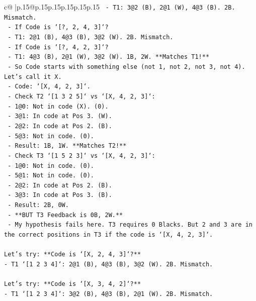 \documentclass{article}
\begin{document}
{\begin{supertabular}{c@{$\;$}|p{.15\linewidth}@{}p{.15\linewidth}p{.15\linewidth}p{.15\linewidth}p{.15\linewidth}p{.15\linewidth}}
{{{\texttt{        {-} T1: 3@2 (B), 2@1 (W), 4@3 (B). 2B. Mismatch.} \\
\texttt{      {-} If Code is `{[}?, 2, 4, 3{]}`?} \\
\texttt{        {-} T1: 2@1 (B), 4@3 (B), 3@2 (W). 2B. Mismatch.} \\
\texttt{      {-} If Code is `{[}?, 4, 2, 3{]}`?} \\
\texttt{        {-} T1: 4@3 (B), 2@1 (W), 3@2 (W). 1B, 2W. **Matches T1!**} \\
\texttt{        {-} So Code starts with something else (not 1, not 2, not 3, not 4). Let's call it X.} \\
\texttt{        {-} Code: `{[}X, 4, 2, 3{]}`.} \\
\texttt{        {-} Check T2 `{[}1 3 2 5{]}` vs `{[}X, 4, 2, 3{]}`:} \\
\texttt{          {-} 1@0: Not in code (X). (0).} \\
\texttt{          {-} 3@1: In code at Pos 3. (W).} \\
\texttt{          {-} 2@2: In code at Pos 2. (B).} \\
\texttt{          {-} 5@3: Not in code. (0).} \\
\texttt{          {-} Result: 1B, 1W. **Matches T2!**} \\
\texttt{        {-} Check T3 `{[}1 5 2 3{]}` vs `{[}X, 4, 2, 3{]}`:} \\
\texttt{          {-} 1@0: Not in code. (0).} \\
\texttt{          {-} 5@1: Not in code. (0).} \\
\texttt{          {-} 2@2: In code at Pos 2. (B).} \\
\texttt{          {-} 3@3: In code at Pos 3. (B).} \\
\texttt{          {-} Result: 2B, 0W.} \\
\texttt{          {-} **BUT T3 Feedback is 0B, 2W.**} \\
\texttt{          {-} My hypothesis fails here. T3 requires 0 Blacks. But 2 and 3 are in the correct positions in T3 if the code is `{[}X, 4, 2, 3{]}`.} \\
\\ 
\texttt{Let's try: **Code is `{[}X, 2, 4, 3{]}`?**} \\
\texttt{{-} T1 `{[}1 2 3 4{]}`: 2@1 (B), 4@3 (B), 3@2 (W). 2B. Mismatch.} \\
\\ 
\texttt{Let's try: **Code is `{[}X, 3, 4, 2{]}`?**} \\
\texttt{{-} T1 `{[}1 2 3 4{]}`: 3@2 (B), 4@3 (B), 2@1 (W). 2B. Mismatch.} \\
}}}
\end{supertabular}}
\end{document}
